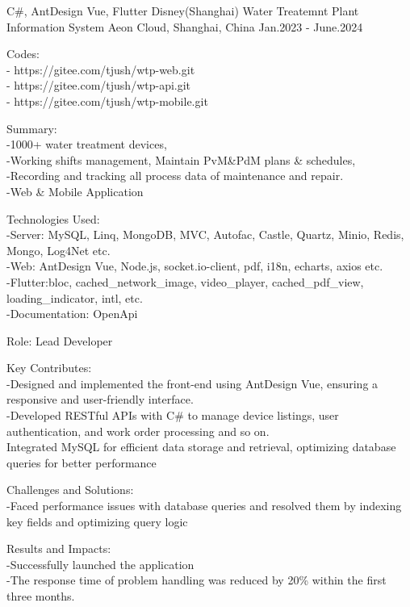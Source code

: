 \begin{cventries}
  \cventry
    {C\#, AntDesign Vue, Flutter} %
    {Disney(Shanghai) Water Treatemnt Plant Information System} %
    {Aeon Cloud, Shanghai, China} %
    {Jan.2023 - June.2024} %
    {
      \begin{cvitems} %
        \item {{Codes:} \\- https://gitee.com/tjush/wtp-web.git \\- https://gitee.com/tjush/wtp-api.git \\- https://gitee.com/tjush/wtp-mobile.git}
        \item {Summary: \\-1000+ water treatment devices, \\-Working shifts management, Maintain PvM\&PdM plans \& schedules, \\-Recording and tracking all process data of maintenance and repair. \\ -Web \& Mobile Application}
        \item {{Technologies Used}: \\ -Server: MySQL, Linq, MongoDB, MVC,  Autofac, Castle, Quartz, Minio, Redis, Mongo, Log4Net etc. \\-Web: AntDesign Vue, Node.js, socket.io-client, pdf, i18n, echarts, axios etc. \\-Flutter:bloc, cached\_network\_image, video\_player, cached\_pdf\_view, loading\_indicator, intl, etc. \\ -Documentation: OpenApi}
        \item {{Role}: Lead Developer}
        \item {{Key Contributes}: \\-Designed and implemented the front-end using AntDesign Vue, ensuring a responsive and user-friendly interface. \\-Developed RESTful APIs with C\#  to manage device listings, user authentication, and work order processing and so on. \\Integrated MySQL for efficient data storage and retrieval, optimizing database queries for better performance}
        \item {{Challenges and Solutions}: \\-Faced performance issues with database queries and resolved them by indexing key fields and optimizing query logic }
        \item {{Results and Impacts}: \\-Successfully launched the application \\-The response time of problem handling was reduced by 20\% within the first three months.}

\end{cvitems}}
\end{cventries}
